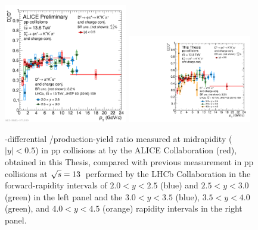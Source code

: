 \begin{figure}[tb]
    \centering
    \includegraphics[width=0.48\textwidth]{Figures/Chapter 7/dsoverdpluscomparisonlhcb.pdf}
    \includegraphics[width=0.48\textwidth]{Figures/Chapter 7/DsOverDplusComparisonLHCbHighRap.pdf}
    \caption{\pt-differential \ds/\dpl production-yield ratio measured at midrapidity ($\lvert y\rvert<0.5$) in pp collisions at \thirteen by the ALICE Collaboration (red), obtained in this Thesis, compared with previous measurement in pp collisions at $\sqrt{s}=13$~\tev performed by the LHCb Collaboration in the forward-rapidity intervals of $2.0<y<2.5$ (blue) and $2.5<y<3.0$ (green) in the left panel and the $3.0<y<3.5$ (blue), $3.5<y<4.0$ (green), and $4.0<y<4.5$ (orange) rapidity intervals in the right panel.}
    \label{fig:dsdplvsrapidity}
\end{figure}


